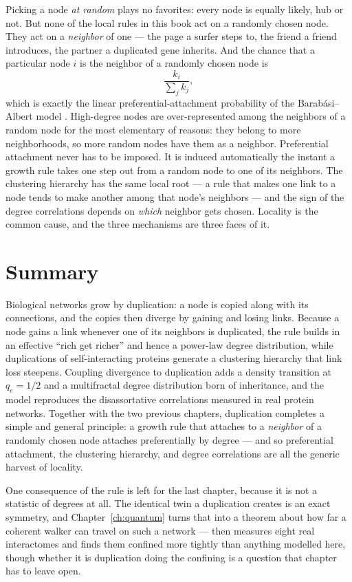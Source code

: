 Picking a node \emph{at random} plays no favorites: every node is equally likely,
hub or not. But none of the local rules in this book act on a randomly chosen
node. They act on a \emph{neighbor} of one --- the page a surfer steps to, the
friend a friend introduces, the partner a duplicated gene inherits. And the
chance that a particular node $i$ is the neighbor of a randomly chosen node is
\begin{equation}
  \frac{k_i}{\sum_j k_j},
  \label{eq:dup-unifying}
\end{equation}
which is exactly the linear preferential-attachment probability of the
Barab\'asi--Albert model \citep{barabasi1999}. High-degree nodes are
over-represented among the neighbors of a random node for the most elementary of
reasons: they belong to more neighborhoods, so more random nodes have them as a
neighbor. Preferential attachment never has to be imposed. It is induced
automatically the instant a growth rule takes one step out from a random node to
one of its neighbors. The clustering hierarchy has the same local root --- a rule
that makes one link to a node tends to make another among that node's neighbors
--- and the sign of the degree correlations depends on \emph{which} neighbor gets
chosen. Locality is the common cause, and the three mechanisms are three faces of
it.

\section{Summary}

Biological networks grow by duplication: a node is copied along with its
connections, and the copies then diverge by gaining and losing links. Because a
node gains a link whenever one of its neighbors is duplicated, the rule builds in
an effective ``rich get richer'' and hence a power-law degree distribution, while
duplications of self-interacting proteins generate a clustering hierarchy that
link loss steepens. Coupling divergence to duplication adds a density transition
at $q_e=1/2$ and a multifractal degree distribution born of inheritance, and the
model reproduces the disassortative correlations measured in real protein
networks. Together with the two previous chapters, duplication completes a simple
and general principle: a growth rule that attaches to a \emph{neighbor} of a
randomly chosen node attaches preferentially by degree --- and so preferential
attachment, the clustering hierarchy, and degree correlations are all the generic
harvest of locality.

One consequence of the rule is left for the last chapter, because it is not a
statistic of degrees at all. The identical twin a duplication creates is an exact
symmetry, and Chapter~\ref{ch:quantum} turns that into a theorem about how far a
coherent walker can travel on such a network --- then measures eight real interactomes
and finds them confined more tightly than anything modelled here, though whether it is
duplication doing the confining is a question that chapter has to leave open.
